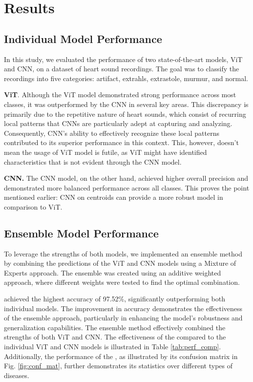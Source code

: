 \section{Results} \label{results}

\subsection{Individual Model Performance}

In this study, we evaluated the performance of two state-of-the-art models, ViT and CNN, on a dataset of heart sound recordings. The goal was to classify the recordings into five categories: artifact, extrahls, extrastole, murmur, and normal.

\textbf{ViT}. Although the ViT model demonstrated strong performance across most classes, it was outperformed by the CNN in several key areas. This discrepancy is primarily due to the repetitive nature of heart sounds, which consist of recurring local patterns that CNNs are particularly adept at capturing and analyzing. Consequently, CNN's ability to effectively recognize these local patterns contributed to its superior performance in this context. This, however, doesn't mean the usage of ViT model is futile, as ViT might have identified characteristics that is not evident through the CNN model.

\textbf{CNN.} The CNN model, on the other hand, achieved higher overall precision and demonstrated more balanced performance across all classes. This proves the point mentioned earlier: CNN on centroids can provide a more robust model in comparison to ViT.


\subsection{Ensemble Model Performance}

To leverage the strengths of both models, we implemented an ensemble method by combining the predictions of the ViT and CNN models using a Mixture of Experts approach. The ensemble was created using an additive weighted approach, where different weights were tested to find the optimal combination.

\ENACT achieved the highest accuracy of 97.52\%, significantly outperforming both individual models. The improvement in accuracy demonstrates the effectiveness of the ensemble approach, particularly in enhancing the model's robustness and generalization capabilities. The ensemble method effectively combined the strengths of both ViT and CNN. The effectiveness of the \ENACT compared to the individual ViT and CNN models is illustrated in Table \ref{tab:perf_comp}. Additionally, the performance of the \ENACT, as illustrated by its confusion matrix in Fig. \ref{fig:conf_mat}, further demonstrates its statistics over different types of diseases.

